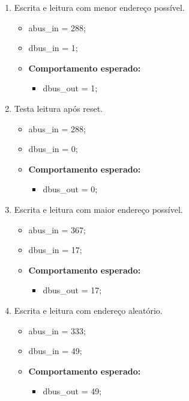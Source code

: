 \documentclass{article}
\begin{document}
\begin{enumerate}
    \item  Escrita e leitura com menor endereço possível.
    \begin{itemize}
        \item abus\_in = 288;
        \item dbus\_in = 1;
        \item \textbf{Comportamento esperado:}
        \begin{itemize}
            \item dbus\_out = 1;
        \end{itemize}
    \end{itemize}
    
    \item Testa leitura após reset.
    \begin{itemize}
        \item abus\_in = 288;
        \item dbus\_in = 0;
        \item \textbf{Comportamento esperado:}
        \begin{itemize}
            \item dbus\_out = 0;
        \end{itemize}
    \end{itemize}

    \item  Escrita e leitura com maior endereço possível.
    \begin{itemize}
        \item abus\_in = 367;
        \item dbus\_in = 17;
        \item \textbf{Comportamento esperado:}
        \begin{itemize}
            \item dbus\_out = 17;
        \end{itemize}
    \end{itemize}

    \item  Escrita e leitura com endereço aleatório.
    \begin{itemize}
        \item abus\_in = 333;
        \item dbus\_in = 49;
        \item \textbf{Comportamento esperado:}
        \begin{itemize}
            \item dbus\_out = 49;
        \end{itemize}
    \end{itemize}
\end{enumerate}
\end{document}
